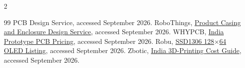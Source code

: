 \documentclass[10pt]{article}
\begin{document}
\begin{multicols}{2}
\begin{thebibliography}{99}
{PCB Design Service}, accessed September 2026.
RoboThings, \href{https://robothings.in/product-casing-enclosure-design-service/}
{Product Casing and Enclosure Design Service}, accessed September 2026.
WHYPCB, \href{https://www.whypcb.com/pcb-prototype-service-india}
{India Prototype PCB Pricing}, accessed September 2026.
Robu, \href{https://robu.in/product/0-96-inch-oled/}
{SSD1306 128$\times$64 OLED Listing}, accessed September 2026.
Zbotic, \href{https://zbotic.in/3d-printing-costs-india-calculate-material-and-electricity/}
{India 3D-Printing Cost Guide}, accessed September 2026.
\end{thebibliography}
\end{multicols}
\end{document}
